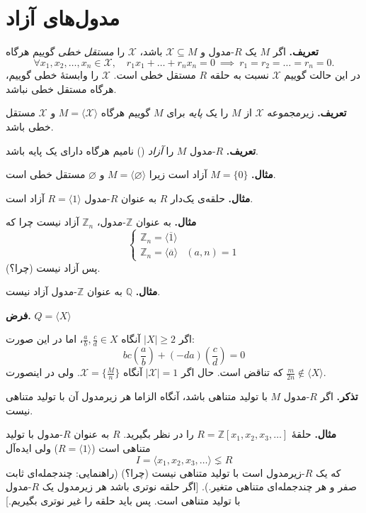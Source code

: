 \section{}
\section*{مدول‌های آزاد}


\textbf{تعریف.} اگر $M$ یک $R$-مدول و $\mathcal{X} \subseteq M$ باشد،
$\mathcal{X}$ را \textit{مستقل خطی} گوییم هرگاه
\[
    \forall x_1, x_2, \dots, x_n \in \mathcal{X}, \quad r_1 x_1 + \dots + r_n x_n = 0 \ \implies\ r_1 = r_2 = \dots = r_n = 0.
\]
در این حالت گوییم $\mathcal{X}$ نسبت به حلقه $R$ مستقل خطی است.
$\mathcal{X}$ را وابستهٔ خطی گوییم، هرگاه مستقل خطی نباشد.

\textbf{تعریف.} زیرمجموعه $\mathcal{X}$ از $M$ را یک \textit{پایه} برای $M$ گوییم هرگاه $M = \langle \mathcal{X} \rangle$ و $\mathcal{X}$ مستقل خطی باشد.

\textbf{تعریف.} $R$-مدول $M$ را \textit{آزاد} () نامیم هرگاه دارای یک پایه باشد.

\textbf{مثال.} $M = \{0\}$ آزاد است زیرا $M = \langle \varnothing \rangle$ و $\varnothing$ مستقل خطی است.

\textbf{مثال.} حلقه‌ی یک‌دار $R$ به عنوان $R$-مدول $R = \langle 1 \rangle$ آزاد است.

\textbf{مثال.} به عنوان $\mathbb{Z}$-مدول، $\mathbb{Z}_n$ آزاد نیست
چرا که
\[
    \begin{cases}
        \mathbb{Z}_n = \langle \overline{1} \rangle              \\
        \mathbb{Z}_n = \langle \overline{a} \rangle & (a, n) = 1
    \end{cases}
\]
پس آزاد نیست (چرا؟).

\textbf{مثال.} $\mathbb{Q}$ به عنوان $\mathbb{Z}$-مدول آزاد نیست.

\textbf{فرض.} $Q = \langle X \rangle$


اگر $|X| \ge 2$ آنگاه $\frac{a}{b}, \frac{c}{d} \in X$، اما در این صورت:
\[
    bc \left( \frac{a}{b} \right) + (-da) \left( \frac{c}{d} \right) = 0
\]
که تناقض است.
حال اگر
$|\mathcal{X}| = 1$
آنگاه
\(\mathcal{X} = \{\frac{M}{n}\}\).
ولی در اینصورت
\(\frac{m}{2n}\notin \langle X \rangle\).

\hrulefill

\textbf{تذکر.} اگر $R$-مدول $M$ با تولید متناهی باشد، آنگاه الزاما هر زیرمدول آن با تولید متناهی نیست.

\textbf{مثال.} حلقهٔ $R = \mathbb{Z}[x_1, x_2, x_3, \dots]$ را در نظر بگیرید. $R$ به عنوان $R$-مدول با تولید متناهی است ($R = \langle 1 \rangle$) ولی ایده‌آل
\[
    I = \langle x_1, x_2, x_3, \dots \rangle \lneq R
\]
که یک $R$-زیرمدول است با تولید متناهی نیست (چرا؟) (راهنمایی: چندجمله‌ای ثابت صفر و هر چندجمله‌ای متناهی متغیر.).
    [اگر حلقه نوتری باشد هر زیرمدول یک $R$-مدول با تولید متناهی است. پس باید حلقه را غیر نوتری بگیریم.]
\[
    \text{}
\]

